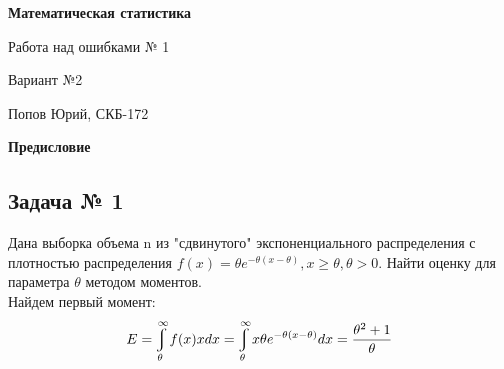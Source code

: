 \documentclass[a4paper,12pt, oneside]{book}
\let\int\varint
\begin{document}
	\pagestyle{plain}
	
	\begin{titlepage}	
		\begin{center}
			{\Huge \textbf{Математическая статистика}}
			\vspace{30mm}
			
			{\Huge Работа над ошибками  № 1 \\}
			\vspace{30mm}
			
			{\huge Вариант №2}
			\vspace{30mm}
			
			{\Large Попов Юрий, СКБ-172}
		\end{center}
	\end{titlepage}
	
	
\begin{spacing}{0.99}          
	\tableofcontents               
\end{spacing}
\setcounter{secnumdepth}{-1} %



\newpage
\begin{center}
	{\Huge{\bf{Предисловие}}}
\end{center}




\begin{center}
	\chapter{Задача № 1}
\end{center}

Дана выборка объема n из "сдвинутого"$  $  экспоненциального распределения с плотностью распределения $ f(x) = \theta e^{-\theta(x-\theta)} , x \geq \theta, \theta > 0.$ Найти оценку для параметра $ \theta $ методом моментов.\\



Найдем первый момент:
$$
E = \int_{\theta}^{\infty} f(x) x dx = \int_{\theta}^{\infty} x \theta e^{-\theta(x-\theta)} dx = \frac{\theta^2 + 1}{\theta}
$$
\end{document}
